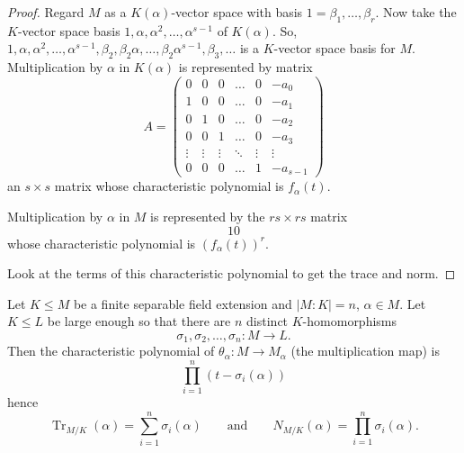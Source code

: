 \documentclass{article}
\DeclareMathOperator{\Tr}{Tr}
\begin{document}
\begin{proof}
    Regard $M$ as a $K(\alpha)$-vector space with basis $1 = \beta_1, \dotsc, \beta_r$.
    Now take the $K$-vector space basis $1, \alpha, \alpha^2, \dotsc, \alpha^{s-1}$ of $K(\alpha)$.
    So, $1, \alpha, \alpha^2, \dotsc, \alpha^{s-1}, \beta_2, \beta_2 \alpha, \dotsc, \beta_2 \alpha^{s-1}, \beta_3, \dotsc$ is a $K$-vector space basis for $M$.
    Multiplication by $\alpha$ in $K(\alpha)$ is represented by matrix
    \begin{equation*}
        A =
        \begin{pmatrix}
            0      & 0      & 0      & \dots  & 0      & -a_0     \\
            1      & 0      & 0      & \dots  & 0      & -a_1     \\
            0      & 1      & 0      & \dots  & 0      & -a_2     \\
            0      & 0      & 1      & \dots  & 0      & -a_3     \\
            \vdots & \vdots & \vdots & \ddots & \vdots & \vdots   \\
            0      & 0      & 0      & \dots  & 1      & -a_{s-1}
        \end{pmatrix}
    \end{equation*}
    an $s \times s$ matrix whose characteristic polynomial is $f_\alpha(t)$.

    Multiplication by $\alpha$ in $M$ is represented by the $rs \times rs$ matrix
    \begin{equation*}
        10 %
    \end{equation*}
    whose characteristic polynomial is $(f_\alpha(t))^r$.

    Look at the terms of this characteristic polynomial to get the trace and norm.
\end{proof}

\begin{nthm}\label{thm:2.20}
    Let $K \leq M$ be a finite separable field extension and $|M:K| = n$, $\alpha \in M$.
    Let $K \leq L$ be large enough so that there are $n$ distinct $K$-homomorphisms
    \begin{equation*}
        \sigma_1, \sigma_2, \dotsc, \sigma_n: M \longrightarrow L.
    \end{equation*}
    Then the characteristic polynomial of $\theta_\alpha:M \to M_\alpha$ (the multiplication map) is
    \begin{equation*}
        \prod_{i=1}^n (t-\sigma_i(\alpha))
    \end{equation*}
    hence
    \begin{equation*}
        \Tr_{M/K} (\alpha) = \sum_{i=1}^n \sigma_i(\alpha) \qquad \text{and} \qquad N_{M/K}(\alpha) = \prod_{i=1}^n \sigma_i(\alpha).
    \end{equation*}
\end{nthm}
\end{document}
